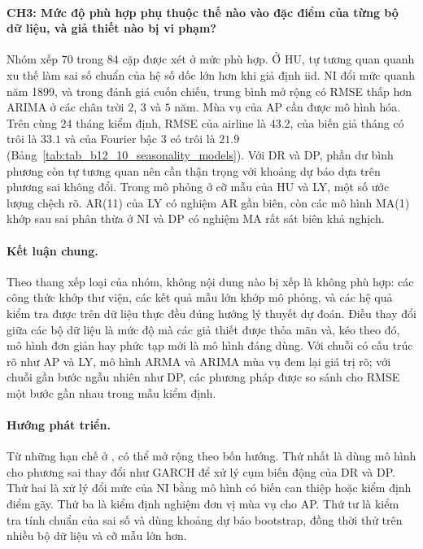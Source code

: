 \paragraph{CH3: Mức độ phù hợp phụ thuộc thế nào vào đặc điểm của từng bộ dữ liệu, và giả thiết nào bị vi phạm?}
Nhóm xếp $70$ trong $84$ cặp được xét ở mức phù hợp. Ở HU, tự tương quan quanh xu thế làm sai số chuẩn của hệ số dốc lớn hơn khi giả định iid. NI đổi mức quanh năm 1899, và trong đánh giá cuốn chiếu, trung bình mở rộng có RMSE thấp hơn ARIMA ở các chân trời $2$, $3$ và $5$ năm. Mùa vụ của AP cần được mô hình hóa. Trên cùng $24$ tháng kiểm định, RMSE của airline là $43.2$, của biến giả tháng có trôi là $33.1$ và của Fourier bậc 3 có trôi là $21.9$ (Bảng~\ref{tab:tab_b12_10_seasonality_models}). Với DR và DP, phần dư bình phương còn tự tương quan nên cần thận trọng với khoảng dự báo dựa trên phương sai không đổi. Trong mô phỏng ở cỡ mẫu của HU và LY, một số ước lượng chệch rõ. AR(11) của LY có nghiệm AR gần biên, còn các mô hình MA(1) khớp sau sai phân thừa ở NI và DP có nghiệm MA rất sát biên khả nghịch.

\paragraph{Kết luận chung.}
Theo thang xếp loại của nhóm, không nội dung nào bị xếp là không phù hợp: các công thức khớp thư viện, các kết quả mẫu lớn khớp mô phỏng, và các hệ quả kiểm tra được trên dữ liệu thực đều đúng hướng lý thuyết dự đoán. Điều thay đổi giữa các bộ dữ liệu là mức độ mà các giả thiết được thỏa mãn và, kéo theo đó, mô hình đơn giản hay phức tạp mới là mô hình đáng dùng. Với chuỗi có cấu trúc rõ như AP và LY, mô hình ARMA và ARIMA mùa vụ đem lại giá trị rõ; với chuỗi gần bước ngẫu nhiên như DP, các phương pháp được so sánh cho RMSE một bước gần nhau trong mẫu kiểm định.

\paragraph{Hướng phát triển.}
Từ những hạn chế ở , có thể mở rộng theo bốn hướng. Thứ nhất là dùng mô hình cho phương sai thay đổi như GARCH để xử lý cụm biến động của DR và DP. Thứ hai là xử lý đổi mức của NI bằng mô hình có biến can thiệp hoặc kiểm định điểm gãy. Thứ ba là kiểm định nghiệm đơn vị mùa vụ cho AP. Thứ tư là kiểm tra tính chuẩn của sai số và dùng khoảng dự báo bootstrap, đồng thời thử trên nhiều bộ dữ liệu và cỡ mẫu lớn hơn.
